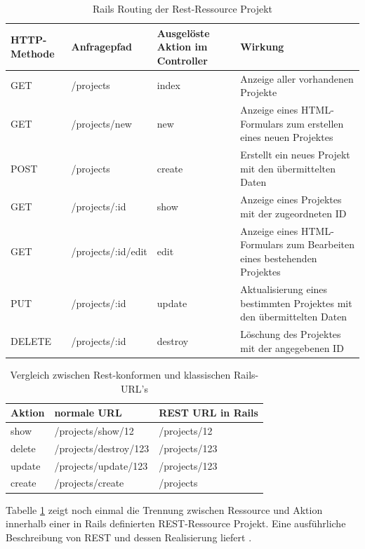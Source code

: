 \begin{table}[!h]
\caption{Rails Routing der Rest-Ressource Projekt}
\center
\begin{tabular}[!ht]{|p{2cm}|p{3cm}|p{3cm}|p{6cm}|}
\hline
HTTP-Methode & Anfragepfad & Ausgelöste Aktion im Controller & Wirkung\\
\hline
GET	& /projects & index & Anzeige aller vorhandenen Projekte\\
\hline
GET	& /projects/new	& new &	Anzeige eines HTML-Formulars zum erstellen eines neuen Projektes\\
\hline
POST & /projects & create & Erstellt ein neues Projekt mit den übermittelten Daten\\
\hline
GET & /projects/:id &	show &	Anzeige eines Projektes mit der zugeordneten ID\\
\hline
GET	& /projects/:id/edit & edit & Anzeige eines HTML-Formulars zum Bearbeiten eines bestehenden Projektes\\
\hline
PUT	& /projects/:id &	update & Aktualisierung eines bestimmten Projektes mit den übermittelten Daten\\
\hline
DELETE & /projects/:id &	destroy &	Löschung des Projektes mit der angegebenen ID\\
\hline
\end{tabular}
\end{table}

\begin{table}[!ht]
\caption{Vergleich zwischen Rest-konformen und klassischen Rails-URL's}
\label{tab.restnonrest}
\center
\begin{tabular}[!ht]{|l|l|l|}
\hline
Aktion & normale URL & 	REST URL in Rails \\
\hline
show &	/projects/show/12 &	/projects/12 \\
\hline
delete & /projects/destroy/123 & /projects/123 \\
\hline
update & /projects/update/123 &	/projects/123 \\
\hline
create & /projects/create & /projects \\
\hline
\end{tabular}
\end{table}

Tabelle \ref{tab.restnonrest} zeigt noch einmal die Trennung zwischen Ressource und Aktion innerhalb einer in Rails definierten REST-Ressource Projekt. Eine ausführliche Beschreibung von REST und dessen Realisierung liefert \cite{restful}.

\newpage
